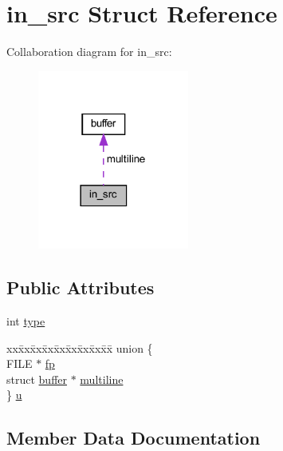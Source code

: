 \hypertarget{structin__src}{}\section{in\+\_\+src Struct Reference}
\label{structin__src}


Collaboration diagram for in\+\_\+src\+:
\nopagebreak
\begin{figure}[H]
\begin{center}
\leavevmode
\includegraphics[width=141pt]{structin__src__coll__graph}
\end{center}
\end{figure}
\subsection*{Public Attributes}
\begin{DoxyCompactItemize}
\item 
int \hyperlink{structin__src_a8e338b762bd66893ba05ebbf002c6d6f}{type}
\item 
\begin{tabbing}
xx\=xx\=xx\=xx\=xx\=xx\=xx\=xx\=xx\=\kill
union \{\\
\>FILE $\ast$ \hyperlink{structin__src_a625b87c8bb54789f2499a91ca733be4f}{fp}\\
\>struct \hyperlink{structbuffer}{buffer} $\ast$ \hyperlink{structin__src_a5099532957aa1b36cd335e660b40bd49}{multiline}\\
\} \hyperlink{structin__src_a98eb3d3e648b98b8b202f30baddef04a}{u}\\

\end{tabbing}\end{DoxyCompactItemize}


\subsection{Member Data Documentation}
\hypertarget{structin__src_a625b87c8bb54789f2499a91ca733be4f}{}
